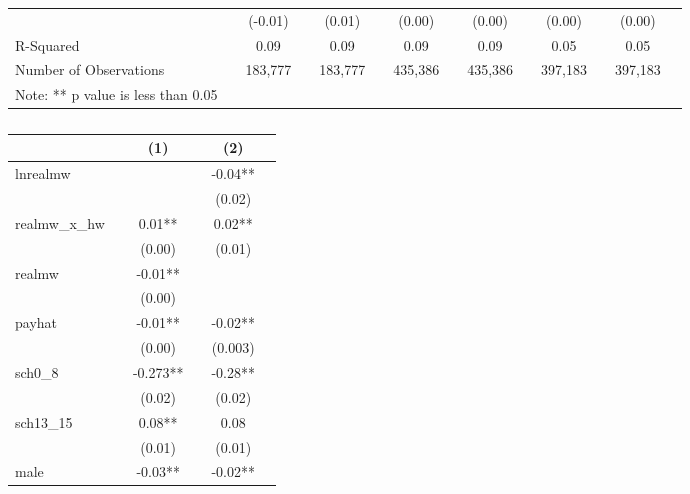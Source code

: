 \documentclass{article}
\begin{document}
\begin{landscape}
\begin{table}[ht]
\begin{tabular}{llclclclclclcl}
                       &  & (-0.01)    &     & (0.01)      &  & (0.00)        &      & (0.00)        &  & (0.00)        &     & (0.00)       &  \\
R-Squared              &  & 0.09          &     & 0.09         &  & 0.09           &      & 0.09          &  & 0.05          &     & 0.05          &  \\
Number of Observations &  & 183,777         &     & 183,777        &  & 435,386          &      & 435,386         &  & 397,183         &     & 397,183 & \\
\hline
Note: ** p value is less than 0.05\\
\end{tabular}
\end{table}
\end{landscape}

\begin{table}[ht]
\centering
\caption{}
\label{my-label}
\begin{tabular}{llclcl}
\hline
                       &  & (1) &            & (2) &  \\
\hline
lnrealmw               &  &              &            & -0.04**   &    \\
                       &  &              &            & (0.02)     &    \\
realmw\_x\_hw          &  & 0.01**         &            & 0.02**    & \\
                       &  & (0.00)        &            & (0.01)    &   \\
realmw                 &  & -0.01**        &            &              &  \\
                       &  & (0.00)        &            &              & \\
payhat                 &  & -0.01**       &            & -0.02**    &   \\
                       &  & (0.00)         &            & (0.003)    &   \\
sch0\_8                &  & -0.273**       &            & -0.28**    &  \\
                       &  & (0.02)        &            & (0.02)     &   \\
sch13\_15              &  & 0.08**     &            & 0.08     &  \\
                       &  & (0.01)    &            & (0.01)     &   \\
male                   &  & -0.03**    &            & -0.02**    &  \\

\end{tabular}
\end{table}
\end{document}

